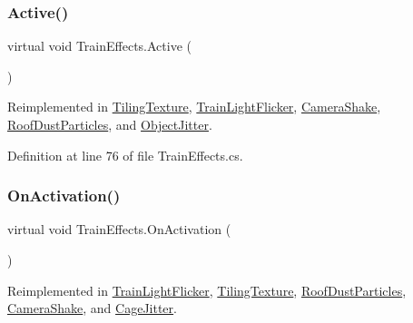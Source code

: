 \subsubsection{\texorpdfstring{Active()}{Active()}}
{\footnotesize\ttfamily virtual void Train\+Effects.\+Active (\begin{DoxyParamCaption}{ }\end{DoxyParamCaption})\hspace{0.3cm}{\ttfamily [virtual]}}



Reimplemented in \mbox{\hyperlink{class_tiling_texture_ad2e8292d65a205d9a05c1cc38f23ec6e}{Tiling\+Texture}}, \mbox{\hyperlink{class_train_light_flicker_a56fcd413440a84b2974c8c37df9b8119}{Train\+Light\+Flicker}}, \mbox{\hyperlink{class_camera_shake_a386499c12399f010723509525fd0fae0}{Camera\+Shake}}, \mbox{\hyperlink{class_roof_dust_particles_a895fc128e3fdb6c87a4267baf26827e9}{Roof\+Dust\+Particles}}, and \mbox{\hyperlink{class_object_jitter_a77b8c9264b6894a2971d1b716590e159}{Object\+Jitter}}.



Definition at line 76 of file Train\+Effects.\+cs.

\mbox{\label{class_train_effects_ad77aba799a5d19a141128639a4bebcad}} 
\subsubsection{\texorpdfstring{On\+Activation()}{OnActivation()}}
{\footnotesize\ttfamily virtual void Train\+Effects.\+On\+Activation (\begin{DoxyParamCaption}{ }\end{DoxyParamCaption})\hspace{0.3cm}{\ttfamily [virtual]}}



Reimplemented in \mbox{\hyperlink{class_train_light_flicker_ac3959dac6aa192f03d493625d28a14de}{Train\+Light\+Flicker}}, \mbox{\hyperlink{class_tiling_texture_a83ea89d5d92568bd86a0c5bd22a3bb41}{Tiling\+Texture}}, \mbox{\hyperlink{class_roof_dust_particles_a34d700905e7de95c5381309d20846f1b}{Roof\+Dust\+Particles}}, \mbox{\hyperlink{class_camera_shake_a255a08f5518a42755e063a35ffe2523f}{Camera\+Shake}}, and \mbox{\hyperlink{class_cage_jitter_a31ae5a4505b942993f98a0141da454c2}{Cage\+Jitter}}.



